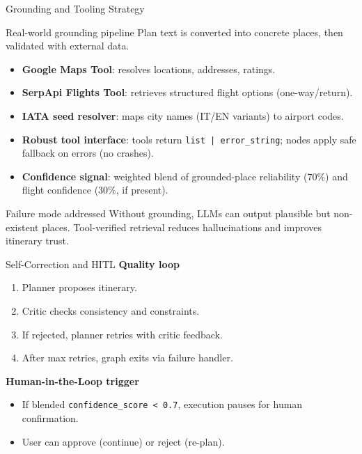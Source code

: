 \documentclass[9pt]{beamer}
\begin{document}
\begin{frame}{Grounding and Tooling Strategy}
\begin{block}{Real-world grounding pipeline}
Plan text is converted into concrete places, then validated with external data.
\end{block}

\begin{itemize}
    \item \textbf{Google Maps Tool}: resolves locations, addresses, ratings.
    \item \textbf{SerpApi Flights Tool}: retrieves structured flight options (one-way/return).
    \item \textbf{IATA seed resolver}: maps city names (IT/EN variants) to airport codes.
    \item \textbf{Robust tool interface}: tools return \texttt{list | error\_string}; nodes apply safe fallback on errors (no crashes).
    \item \textbf{Confidence signal}: weighted blend of grounded-place reliability (\(70\%\)) and flight confidence (\(30\%\), if present).
\end{itemize}

\begin{alertblock}{Failure mode addressed}
Without grounding, LLMs can output plausible but non-existent places.
Tool-verified retrieval reduces hallucinations and improves itinerary trust.
\end{alertblock}
\end{frame}

\begin{frame}{Self-Correction and HITL}
\textbf{Quality loop}
\begin{enumerate}
    \item Planner proposes itinerary.
    \item Critic checks consistency and constraints.
    \item If rejected, planner retries with critic feedback.
    \item After max retries, graph exits via failure handler.
\end{enumerate}

\textbf{Human-in-the-Loop trigger}
\begin{itemize}
    \item If blended \texttt{confidence\_score < 0.7},
    execution pauses for human confirmation.
    \item User can approve (continue) or reject (re-plan).
\end{itemize}
\end{frame}
\end{document}
